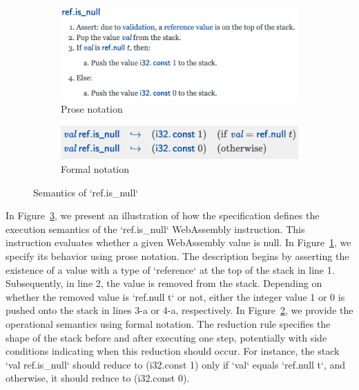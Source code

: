 \begin{figure}
  \centering
  \begin{subfigure}[b]{0.45\textwidth}
    \includegraphics[width=\textwidth]{img/prosespec1}
    \caption{Prose notation}
    \label{fig:prosespec1}
  \end{subfigure}
  \hfill
  \begin{subfigure}[b]{0.45\textwidth}
    \includegraphics[width=\textwidth]{img/formalspec1}
    \caption{Formal notation}
    \label{fig:formalspec1}
  \end{subfigure}

  \caption{Semantics of `ref.is\_null`}
  \label{fig:spec1}
\end{figure}

In Figure~\ref{fig:spec1}, we present an illustration of how the specification defines the
execution semantics of the `ref.is\_null` WebAssembly instruction. This
instruction evaluates whether a given WebAssembly value is null. In Figure~\ref{fig:prosespec1},
we specify its behavior using prose notation. The description begins by
asserting the existence of a value with a type of `reference` at the top of the
stack in line 1. Subsequently, in line 2, the value is removed from the stack.
Depending on whether the removed value is `ref.null t` or not, either the
integer value 1 or 0 is pushed onto the stack in lines 3-a or 4-a,
respectively. In Figure~\ref{fig:formalspec1}, we provide the operational semantics using formal
notation. The reduction rule specifies the shape of the stack before and after
executing one step, potentially with side conditions indicating when this
reduction should occur. For instance, the stack `val ref.is\_null` should reduce
to (i32.const 1) only if `val` equals `ref.null t`, and otherwise, it should
reduce to (i32.const 0).

